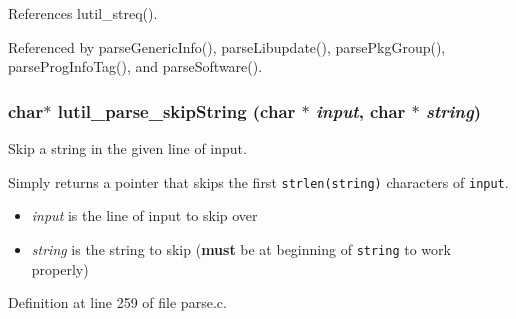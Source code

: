 References lutil\_\-streq().

Referenced by parse\-Generic\-Info(), parse\-Libupdate(), parse\-Pkg\-Group(), parse\-Prog\-Info\-Tag(), and parse\-Software().
\subsubsection{\setlength{\rightskip}{0pt plus 5cm}char$\ast$ lutil\_\-parse\_\-skip\-String (char $\ast$ {\em input}, char $\ast$ {\em string})}\label{parse_8c_a7}


Skip a string in the given line of input. 

Simply returns a pointer that skips the first {\tt strlen(string)} characters of {\tt input}.

\begin{itemize}
\item {\em input\/} is the line of input to skip over \item {\em string\/} is the string to skip ({\bf must} be at beginning of {\tt string} to work properly) \end{itemize}


Definition at line 259 of file parse.c.